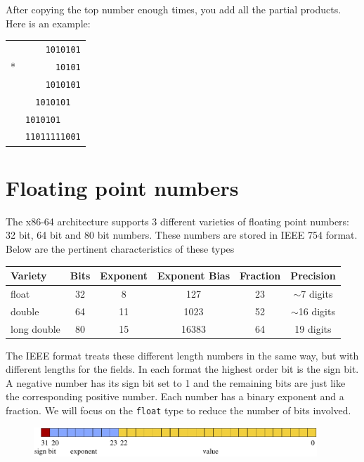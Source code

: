 \documentclass[11pt,b5paper]{book}
\begin{document}
After copying the top number enough times, you add all the partial products.
Here is an example:

\begin{center}
\begin{tabular}{cr}
       & {\tt 1010101} \\
    *  & {\tt 10101} \\
\hline
       & {\tt 1010101} \\
       & {\tt 1010101\ \ } \\
       & {\tt 1010101\ \ \ \ } \\
\hline
       & {\tt 11011111001}
\end{tabular}
\end{center}


\section{Floating point numbers}

The x86-64 architecture supports 3 different varieties of floating point
numbers: 32 bit, 64 bit and 80 bit numbers.
These numbers are stored in IEEE 754 format.
Below are the pertinent characteristics of these types

\begin{center}
\begin{tabular}{|l|c|c|c|c|c|}
\hline
Variety & Bits & Exponent & Exponent Bias & Fraction & Precision \\
\hline
float   &  32  & 8        &   127         & 23       & $\sim$7 digits \\
\hline
double  &  64  & 11       &  1023         & 52       & $\sim$16 digits \\
\hline
long double & 80 & 15     & 16383         & 64       & 19 digits \\
\hline
\end{tabular}
\end{center}

The IEEE format treats these different length numbers in the same way, but
with different lengths for the fields.
In each format the highest order bit is the sign bit.
A negative number has its sign bit set to 1 and the remaining bits are just
like the corresponding positive number.
Each number has a binary exponent and a fraction.
We will focus on the {\tt float} type to reduce the number of bits involved.
\begin{figure}[h!]
\centering\includegraphics[width=0.95\textwidth]{float.pdf}
\end{figure}
\end{document}
